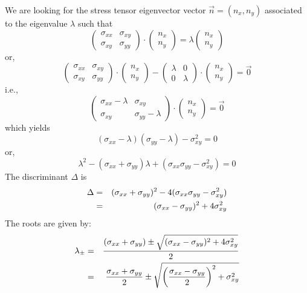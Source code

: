 We are looking for the stress tensor eigenvector vector $\vec{n}=(n_x,n_y)$ associated to the
eigenvalue $\lambda$ such that 
\[
\left(
\begin{array}{cc}
\sigma_{xx} & \sigma_{xy} \\
\sigma_{xy} & \sigma_{yy} 
\end{array}
\right)
\cdot
\left(
\begin{array}{c}
n_x \\ n_y
\end{array}
\right)
=
\lambda
\left(
\begin{array}{c}
n_x \\ n_y
\end{array}
\right)
\]
or,
\[
\left(
\begin{array}{cc}
\sigma_{xx} & \sigma_{xy} \\
\sigma_{xy} & \sigma_{yy} 
\end{array}
\right)
\cdot
\left(
\begin{array}{c}
n_x \\ n_y
\end{array}
\right)
-
\left(
\begin{array}{cc}
\lambda & 0 \\ 
0 & \lambda 
\end{array}
\right)
\cdot
\left(
\begin{array}{c}
n_x \\ n_y
\end{array}
\right)
= \vec{0}
\]
i.e.,
\[
\left(
\begin{array}{cc}
\sigma_{xx}-\lambda  & \sigma_{xy} \\
\sigma_{xy} & \sigma_{yy} -\lambda 
\end{array}
\right)
\cdot
\left(
\begin{array}{c}
n_x \\ n_y
\end{array}
\right)
= \vec{0}
\]
which yields
\[
(\sigma_{xx}-\lambda)(\sigma_{yy}-\lambda)-\sigma_{xy}^2 =0
\]
or, 
\[
\lambda^2 - (\sigma_{xx}+\sigma_{yy}) \lambda   + (\sigma_{xx}\sigma_{yy}-\sigma_{xy}^2) =0
\]
The discriminant $\Delta$ is 
\begin{eqnarray}
\Delta 
&=& (\sigma_{xx}+\sigma_{yy})^2-4(\sigma_{xx}\sigma_{yy}-\sigma_{xy}^2)  \nonumber\\
&=& (\sigma_{xx}-\sigma_{yy})^2 +4\sigma_{xy}^2  \nonumber
\end{eqnarray}
The roots are given by:
\begin{eqnarray}
\lambda_\pm 
&=& \frac{ (\sigma_{xx}+\sigma_{yy}) \pm \sqrt{ (\sigma_{xx}-\sigma_{yy})^2 +4\sigma_{xy}^2 } }{2} \nonumber\\
&=& \frac{ \sigma_{xx}+\sigma_{yy}}{2} \pm \sqrt{ \left(\frac{\sigma_{xx}-\sigma_{yy}}{2}\right)^2 +\sigma_{xy}^2 } \nonumber
\end{eqnarray}
